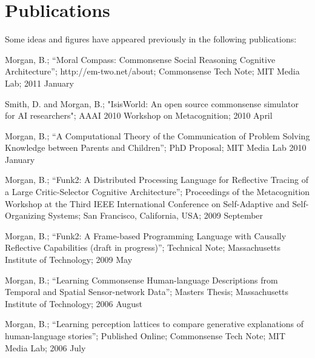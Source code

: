 \chapter*{Publications}
Some ideas and figures have appeared previously in the following publications:

\bigskip

\noindent Morgan, B.; ``Moral Compass: Commonsense Social Reasoning
 Cognitive Architecture''; http://em-two.net/about; Commonsense Tech
 Note; MIT Media Lab; 2011 January

\vspace{5mm}

\noindent Smith, D. and Morgan, B.; "IsisWorld: An open source
 commonsense simulator for AI researchers"; AAAI 2010 Workshop on
 Metacognition; 2010 April

\vspace{5mm}

\noindent Morgan, B.; ``A Computational Theory of the Communication of
 Problem Solving Knowledge between Parents and Children''; PhD
 Proposal; MIT Media Lab 2010 January

\vspace{5mm}

\noindent Morgan, B.; ``Funk2: A Distributed Processing Language for 
 Reflective Tracing of a Large Critic-Selector Cognitive
 Architecture''; Proceedings of the Metacognition Workshop at the
 Third IEEE International Conference on Self-Adaptive and
 Self-Organizing Systems; San Francisco, California, USA; 2009
 September

\vspace{5mm}

\noindent Morgan, B.; ``Funk2: A Frame-based Programming Language with
 Causally Reflective Capabilities (draft in progress)''; Technical
 Note; Massachusetts Institute of Technology; 2009 May

\vspace{5mm}

\noindent Morgan, B.; ``Learning Commonsense Human-language Descriptions
 from Temporal and Spatial Sensor-network Data''; Masters Thesis;
 Massachusetts Institute of Technology; 2006 August

\vspace{5mm}

\noindent Morgan, B.; ``Learning perception lattices to compare
 generative explanations of human-language stories''; Published
 Online; Commonsense Tech Note; MIT Media Lab; 2006 July

